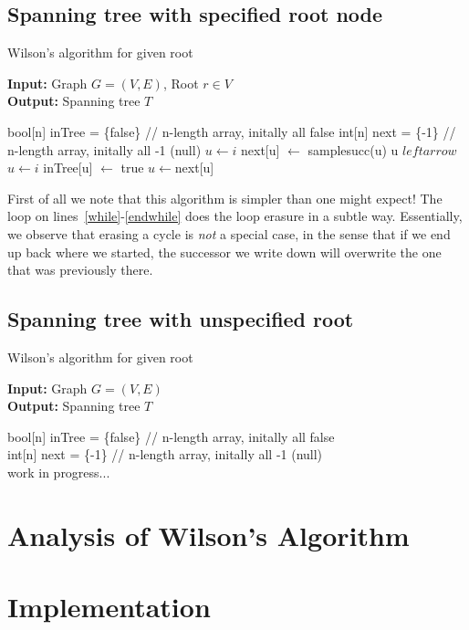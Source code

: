 \documentclass[11pt]{article}
\begin{document}
\subsection{Spanning tree with specified root node}
\begin{algorithm}
\caption{Wilson's algorithm for given root}
\label{alg:root}
\textbf{Input: }Graph $G=(V,E)$, Root $r \in V$ \\
\textbf{Output: }Spanning tree $T$ \\
\begin{algorithmic}
\STATE bool[n] inTree = \{false\} // n-length array, initally all false
\STATE int[n] next = \{-1\}       // n-length array, initally all -1 (null)
\STATE $u \leftarrow i$
\STATE next[u] $\leftarrow$ samplesucc(u)
\STATE u $leftarrow$
\ENDWHILE
\STATE $u \leftarrow i$
 \label{while}
\STATE inTree[u] $\leftarrow$ true
\STATE $u \leftarrow $next[u]
\ENDWHILE \label{endwhile}
\ENDFOR
\end{algorithmic}
\end{algorithm}

First of all we note that this algorithm is simpler than one might expect! The
loop on lines~\ref{while}-\ref{endwhile} does the loop erasure in a subtle way.
Essentially, we observe that erasing a cycle is \emph{not} a special case, in
the sense that if we end up back where we started, the successor we write down
will overwrite the one that was previously there.
\subsection{Spanning tree with unspecified root}
\begin{algorithm}
\caption{Wilson's algorithm for given root}
\label{alg:root}
\textbf{Input: }Graph $G=(V,E)$ \\
\textbf{Output: }Spanning tree $T$ \\
\begin{algorithmic}
\STATE bool[n] inTree = \{false\} // n-length array, initally all false \\
\STATE int[n] next = \{-1\}       // n-length array, initally all -1 (null) \\
\STATE work in progress...
\end{algorithmic}
\end{algorithm}

\section{Analysis of Wilson's Algorithm}


\section{Implementation}

\printbibliography
\end{document}
